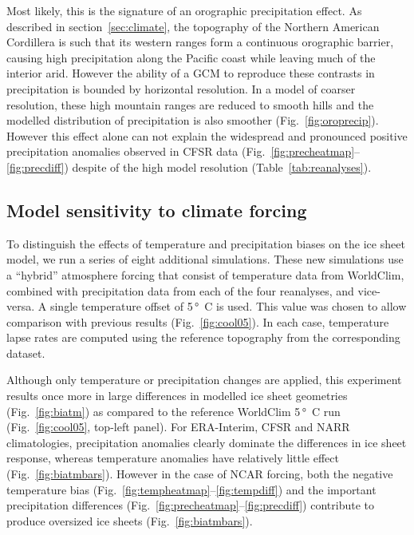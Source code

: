 Most likely, this is the signature of an orographic precipitation effect. As described in section~\ref{sec:climate}, the topography of the Northern American Cordillera is such that its western ranges form a continuous orographic barrier, causing high precipitation along the Pacific coast while leaving much of the interior arid. However the ability of a GCM to reproduce these contrasts in precipitation is bounded by horizontal resolution. In a model of coarser resolution, these high mountain ranges are reduced to smooth hills and the modelled distribution of precipitation is also smoother (Fig.~\ref{fig:oroprecip}). However this effect alone can not explain the widespread and pronounced positive precipitation anomalies observed in CFSR data (Fig.~\ref{fig:precheatmap}--\ref{fig:precdiff}) despite of the high model resolution (Table~\ref{tab:reanalyses}).

\subsection{Model sensitivity to climate forcing}

To distinguish the effects of temperature and precipitation biases on the ice sheet model, we run a series of eight additional simulations. These new simulations use a “hybrid” atmosphere forcing that consist of temperature data from WorldClim, combined with precipitation data from each of the four reanalyses, and vice-versa. A single temperature offset of 5\,\unit{\degree C} is used. This value was chosen to allow comparison with previous results (Fig.~\ref{fig:cool05}). In each case, temperature lapse rates are computed using the reference topography from the corresponding dataset.

Although only temperature or precipitation changes are applied, this experiment results once more in large differences in modelled ice sheet geometries (Fig.~\ref{fig:biatm}) as compared to the reference WorldClim 5\,\unit{\degree C} run (Fig.~\ref{fig:cool05}, top-left panel). For ERA-Interim, CFSR and NARR climatologies, precipitation anomalies clearly dominate the differences in ice sheet response, whereas temperature anomalies have relatively little effect (Fig.~\ref{fig:biatmbars}). However in the case of NCAR forcing, both the negative temperature bias (Fig.~\ref{fig:tempheatmap}--\ref{fig:tempdiff}) and the important precipitation differences (Fig.~\ref{fig:precheatmap}--\ref{fig:precdiff}) contribute to produce oversized ice sheets (Fig.~\ref{fig:biatmbars}).

